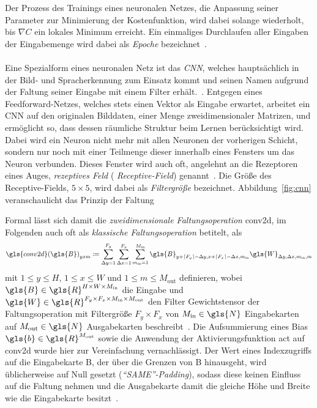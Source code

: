 Der Prozess des Trainings eines neuronalen Netzes, \dhe{} die Anpassung seiner Parameter zur Minimierung der Kostenfunktion, wird dabei solange wiederholt, bis $\nabla C$ ein lokales Minimum erreicht.
Ein einmaliges Durchlaufen aller Eingaben der Eingabemenge wird dabei als \emph{Epoche} bezeichnet~\cite{Nielsen}.
\\\\
Eine Spezialform eines neuronalen Netz ist das \emph{\gls{CNN}}, welches hauptsächlich in der Bild- und Spracherkennung zum Einsatz kommt und seinen Namen aufgrund der Faltung seiner Eingabe mit einem Filter erhält.~\cite{cnn}.
Entgegen eines Feedforward-Netzes, welches stets einen Vektor als Eingabe erwartet, arbeitet ein \gls{CNN} auf den originalen Bilddaten, \dhe{} einer Menge zweidimensionaler Matrizen, und ermöglicht so, dass dessen räumliche Struktur beim Lernen berücksichtigt wird.
Dabei wird ein Neuron nicht mehr mit allen Neuronen der vorherigen Schicht, sondern nur noch mit einer Teilmenge dieser innerhalb eines Fensters um das Neuron verbunden.
Dieses Fenster wird auch oft, angelehnt an die Rezeptoren eines Auges, \emph{rezeptives Feld} (\engl{} \emph{Receptive-Field}) genannt~\cite{cnn}.
Die Größe des Receptive-Fields, \zB{} $5 \times 5$, wird dabei als \emph{Filtergröße} bezeichnet.
Abbildung~\ref{fig:cnn} veranschaulicht das Prinzip der Faltung


Formal lässt sich damit die \emph{zweidimensionale Faltungsoperation} \gls{conv2d}, im Folgenden auch oft als \emph{klassische Faltungsoperation} betitelt, als
\begin{equation*}
  {\gls{conv2d}\left(\gls{B}\right)}_{yxm} \coloneqq \sum_{\Delta y = 1}^{F_y} \sum_{\Delta x = 1}^{F_x} \sum_{m_{\mathrm{in}} = 1}^{M_\mathrm{in}} \gls{B}_{y + \left\lceil F_y \right\rceil - \Delta y, x + \left\lceil F_x \right\rceil - \Delta x, m_{\mathrm{in}}} \gls{W}_{\Delta y, \Delta x, m_{\mathrm{in}}, m}
\end{equation*}
mit $1 \leq y \leq H$, $1 \leq x \leq W$ und $1 \leq m \leq M_{\mathrm{out}}$ definieren, wobei $\gls{B} \in \gls{R}^{H \times W \times M_{\mathrm{in}}}$ die Eingabe und $\gls{W} \in \gls{R}^{F_y \times F_x \times M_{\mathrm{in}} \times M_{\mathrm{out}}}$ den Filter \bzw{} Gewichtstensor der Faltungsoperation mit Filtergröße $F_y \times F_x$ von $M_{\mathrm{in}} \in \gls{N}$ Eingabekarten auf $M_{\mathrm{out}} \in \gls{N}$ Ausgabekarten beschreibt~\cite{tensorflow}.
Die Aufsummierung eines Bias $\gls{b} \in \gls{R}^{M_{\mathrm{out}}}$ sowie die Anwendung der Aktivierungsfunktion \gls{act} auf \gls{conv2d} wurde hier zur Vereinfachung vernachlässigt.
Der Wert eines Indexzugriffs auf die Eingabekarte \gls{B}, der über die Grenzen von \gls{B} hinausgeht, wird üblicherweise auf Null gesetzt (\emph{\enquote{SAME}-Padding}), sodass diese keinen Einfluss auf die Faltung nehmen und die Ausgabekarte damit die gleiche Höhe und Breite wie die Eingabekarte besitzt~\cite{tensorflow}.

